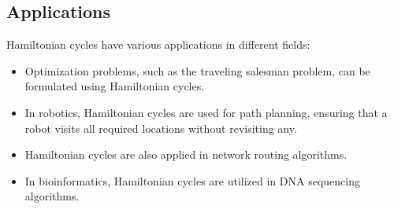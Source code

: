 \documentclass[14pt, times, a4paper]{extarticle}
\begin{document}
\subsection{Applications}

Hamiltonian cycles have various applications in different fields:

\begin{itemize}
  \item Optimization problems, such as the \gls{traveling salesman problem}, can be formulated using Hamiltonian cycles.
  \item In robotics, Hamiltonian cycles are used for path planning, ensuring that a robot visits all required locations without revisiting any.
  \item Hamiltonian cycles are also applied in network routing algorithms.
  \item In bioinformatics, Hamiltonian cycles are utilized in DNA sequencing algorithms.
\end{itemize}


\newpage
\end{document}
